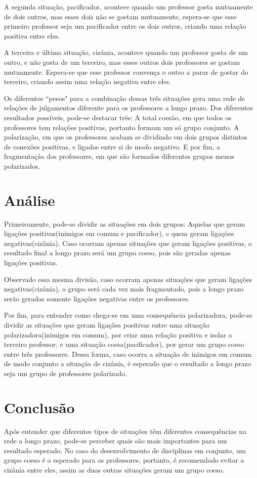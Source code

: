 \documentclass[12pt]{article}
\begin{document}
A segunda situação, pacificador, acontece quando um professor gosta mutuamente de dois outros, mas esses dois não se gostam mutuamente, espera-se que esse primeiro professor seja um pacificador entre os dois outros, criando uma relação positiva entre eles.

A terceira e última situação, cizânia, acontece quando um professor gosta de um outro, e não gosta de um terceiro, mas esses outros dois professores se gostam mutuamente. Espera-se que esse professor convença o outro a parar de gostar do terceiro, criando assim uma relação negativa entre eles.

Os diferentes ``pesos" para a combinação dessas três situações gera uma rede de relações de julgamentos diferente para os professores a longo prazo. Dos diferentes resultados possíveis, pode-se destacar três: A total coesão, em que todos os professores tem relações positivas, portanto formam um só grupo conjunto. A polarização, em que os professores acabam se dividindo em dois grupos distintos de conexões positivas, e ligados entre si de modo negativo. E por fim, a fragmentação dos professores, em que são formados diferentes grupos menos polarizados. 

\section{Análise}

Primeiramente, pode-se dividir as situações em dois grupos: Aquelas que geram ligações positivas(inimigos em comum e pacificador), e quem geram ligações negativas(cizânia). Caso ocorram apenas situações que geram ligações positivas, o resultado final a longo prazo será um grupo coeso, pois são geradas apenas ligações positivas.

Observado essa mesma divisão, caso ocorram apenas situações que geram ligações negativas(cizânia), o grupo será cada vez mais fragmentado, pois a longo prazo serão geradas somente ligações negativas entre os professores.

Por fim, para entender como chega-se em uma consequência polarizadora, pode-se dividir as situações que geram ligações positivas entre uma situação polarizadora(inimigos em comum), por criar uma relação positiva e isolar o terceiro professor, e uma situação coesa(pacificador), por gerar um grupo coeso entre três professores. Dessa forma, caso ocorra a situação de inimigos em comum de modo conjunto a situação de cizânia, é esperado que o resultado a longo prazo seja um grupo de professores polarizado.

\section{Conclusão}

Após entender que diferentes tipos de situações têm diferentes consequências na rede a longo prazo, pode-se perceber quais são mais importantes para um resultado esperado. No caso do desenvolvimento de disciplinas em conjunto, um grupo coeso é o esperado para os professores, portanto, é recomendado evitar a cizânia entre eles, assim as duas outras situações geram um grupo coeso.
\end{document}

